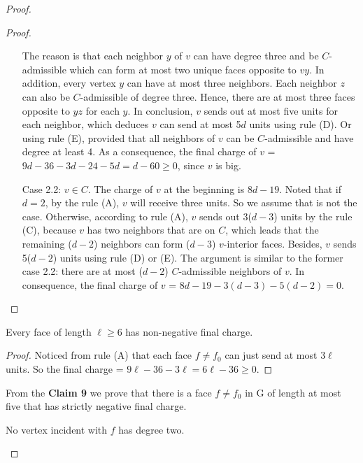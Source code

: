 \begin{proof}
\begin{proof}
\begin{itemize}
    The reason is that each neighbor $y$ of $v$ can have degree three and be $C$-admissible which can form at most two unique faces opposite to $vy$. In addition, every vertex $y$ can have at most three neighbors. Each neighbor $z$ can also be $C$-admissible of degree three. Hence, there are at most three faces opposite to $yz$ for each $y$. In conclusion, $v$ sends out at most five units for each neighbor, which deduces $v$ can send at most 5$d$ units using rule (D). Or using rule (E), provided that all neighbors of $v$ can be $C$-admissible and have degree at least 4. As a consequence, the final charge of $v$ = $9d -36 - 3d - 24 - 5d = d - 60 \geq 0$, since $v$ is big.
    \item[Case 2.2:] \textit{\textbf{$v \in C.$}} The charge of $v$ at the beginning is $8d - 19$. Noted that if $d = 2$, by the rule (A), $v$ will receive three units. So we assume that is not the case. Otherwise, according to rule (A), $v$ sends out 3($d-3$) units by the rule (C), because $v$ has two neighbors that are on $C$, which leads that the remaining ($d-2$) neighbors can form ($d - 3$) $v$-interior faces. Besides, $v$ sends 5($d - 2$) units using rule (D) or (E). The argument is similar to the former case 2.2: there are at most ($d-2$) $C$-admissible neighbors of $v$. In consequence, the final charge of $v$ = $8d - 19 - 3(d - 3) - 5(d - 2) = 0$.
\end{itemize}
\end{proof}

\begin{claim}
Every face of length $\ell \geq 6$ has non-negative final charge.
\end{claim}
\begin{proof}
Noticed from rule (A) that each face $f \ne f_0$ can just send at most 3$\ell$ units. So the final charge = $9\ell - 36 - 3\ell = 6\ell - 36 \geq 0$. 
\end{proof}
From the \textbf{Claim 9} we prove that there is a face $f \ne f_0$ in G of length at most five that has strictly negative final charge.

\begin{corollary}
No vertex incident with $f$ has degree two. \cite{dvorak2013threecoloring}
\end{corollary}


\end{proof}
